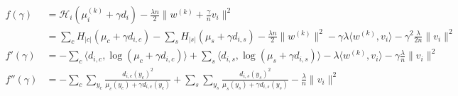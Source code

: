 \documentclass{article}
\DeclareMathOperator{\1}{\mathbb{1}}
\begin{document}
\begin{align*}
	f(\gamma)
	& = \mathcal H_i(\mu_i^{(k)} + \gamma d_i) 
	- \frac{\lambda n}{2} \| w^{(k)} + \frac{\gamma}{n} v_i \|^2 
	\\
	& =  \sum_c H_{|c|}(\mu_c + \gamma d_{i, c}) 
	- \sum_s H_{|s|}(\mu_s + \gamma d_{i, s}) 
	- \frac{\lambda n}{2} \| w^{(k)}\|^2 
	- \gamma \lambda  \langle w^{(k)} , v_i \rangle 
	- \gamma^2 \frac{\lambda}{2n} \|v_i \|^2 
	\\
	f'(\gamma) & =  - \sum_c \langle d_{i, c}, \log(\mu_c + \gamma d_{i, c}) \rangle 
	+ \sum_s \langle d_{i, s} , \log(\mu_s + \gamma d_{i, s}) \rangle 
	- \lambda  \langle w^{(k)} , v_i \rangle 
	- \gamma \frac{\lambda}{n} \|v_i \|^2 
	\\
	f''(\gamma) & = - \sum_c \sum_{y_c} \frac{d_{i, c}(y_c)^2 }{ \mu_c(y_c) + \gamma d_{i, c}(y_c) }
	+ \sum_s \sum_{y_s} \frac{d_{i, s}(y_s)^2 }{ \mu_s(y_s) + \gamma d_{i, s}(y_s) }
	- \frac{\lambda}{n} \|v_i \|^2 
\end{align*}




\end{document}
